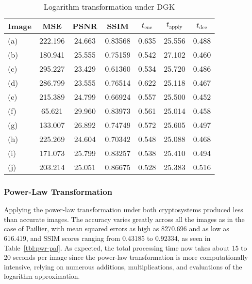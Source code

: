 \begin{table}[!ht]
	\caption{Logarithm transformation under DGK}
	\label{tbl:log-dgk}
    \begin{tabular}{lcccccc}
        \toprule
        Image & MSE  & PSNR & SSIM & $t_\text{enc}$ & $t_\text{apply}$ & $t_\text{dec}$ \\ \midrule
		(a) & 222.196 & 24.663 & 0.83568 & 0.635 & 25.556 & 0.488 \\
		(b) & 180.941 & 25.555 & 0.75159 & 0.542 & 27.102 & 0.460 \\
		(c) & 295.227 & 23.429 & 0.61360 & 0.534 & 25.720 & 0.486 \\
		(d) & 286.799 & 23.555 & 0.76514 & 0.622 & 25.118 & 0.467 \\
		(e) & 215.389 & 24.799 & 0.66924 & 0.557 & 25.500 & 0.452 \\
		(f) & 65.621 & 29.960 & 0.83973 & 0.561 & 25.014 & 0.458 \\
		(g) & 133.007 & 26.892 & 0.74749 & 0.572 & 25.605 & 0.497 \\
		(h) & 225.269 & 24.604 & 0.70342 & 0.548 & 25.088 & 0.468 \\
		(i) & 171.073 & 25.799 & 0.83257 & 0.538 & 25.410 & 0.494 \\
		(j) & 203.214 & 25.051 & 0.86675 & 0.528 & 25.383 & 0.516 \\
		\bottomrule
    \end{tabular}
\end{table}

\subsubsection{Power-Law Transformation}
Applying the power-law transformation under both cryptosystems produced less than accurate images. The accuracy varies greatly across all the images as in the case of Paillier, with mean squared errors as high as 8270.696 and as low as 616.419, and SSIM scores ranging from 0.43185 to 0.92334, as seen in Table~\ref{tbl:pwr-pal}. As expected, the total processing time now takes about 15 to 20 seconds per image since the power-law transformation is more computationally intensive, relying on numerous additions, multiplications, and evaluations of the logarithm approximation.

